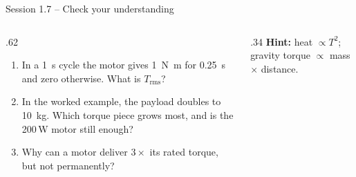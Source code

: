 \documentclass[aspectratio=169,10pt]{beamer}
\begin{document}
\begin{frame}{Session 1.7 -- Check your understanding}
\begin{columns}[T]
\begin{column}{.62\textwidth}
\begin{keybox}
\begin{enumerate}\setlength\itemsep{6pt}
\item In a \SI{1}{\second} cycle the motor gives \SI{1}{\newton\metre} for \SI{0.25}{\second} and zero otherwise. What is $T_\text{rms}$?
\item In the worked example, the payload doubles to \SI{10}{\kilo\gram}. Which torque piece grows most, and is the 200\,W motor still enough?
\item Why can a motor deliver $3\times$ its rated torque, but not permanently?
\end{enumerate}
\end{keybox}
\end{column}
\begin{column}{.34\textwidth}
\small
\textbf{Hint:} heat $\propto T^2$; gravity torque $\propto$ mass $\times$ distance.
\end{column}
\end{columns}
\end{frame}
\end{document}
